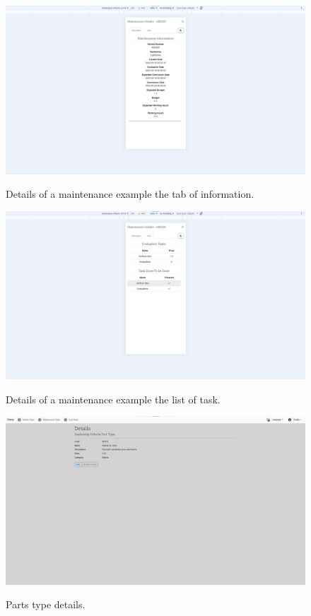 \begin{figure}[htbp]
  \caption{Details of a maintenance example the tab of information.}
  \centering
  \includegraphics[width=\textwidth]{figs/Implementation/client/MaintenanceDetailsInfo}
  \label{fig:MaintenanceDetailsInfo}
\end{figure}


\begin{figure}[htbp]
  \caption{Details of a maintenance example the list of task.}
  \centering
  \includegraphics[width=\textwidth]{figs/Implementation/client/MaintenanceDetailsTasks}
  \label{fig:MaintenanceDetailsTasks}
\end{figure}




\begin{figure}[htbp]
  \caption{Parts type details.}
  \centering
  \includegraphics[width=\textwidth]{figs/Implementation/dealershipAdmin/partsDetails}
  \label{fig:partsDetails}
\end{figure}

